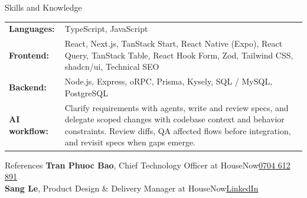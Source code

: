\documentclass{resume}
\begin{document}
\begin{rSection}{Skills and Knowledge}
\begin{tabularx}{\linewidth}{@{}>{\bfseries}l@{\hspace{2.5ex}}X@{}}
Languages: & TypeScript, JavaScript\\
Frontend: & React, Next.js, TanStack Start, React Native (Expo), React Query, TanStack Table, React Hook Form, Zod, Tailwind CSS, shadcn/ui, Technical SEO\\
Backend: & Node.js, Express, oRPC, Prisma, Kysely, SQL / MySQL, PostgreSQL\\
AI workflow: & Clarify requirements with agents, write and review specs, and delegate scoped changes with codebase context and behavior constraints. Review diffs, QA affected flows before integration, and revisit specs when gaps emerge.
\end{tabularx}
\end{rSection}

\begin{rSection}{References}
\textbf{Tran Phuoc Bao}, Chief Technology Officer at HouseNow\hfill\href{tel:0704612891}{0704 612 891}\\
\textbf{Sang Le}, Product Design \& Delivery Manager at HouseNow\hfill\href{https://www.linkedin.com/in/sangle1507/}{LinkedIn}
\end{rSection}
\end{document}
